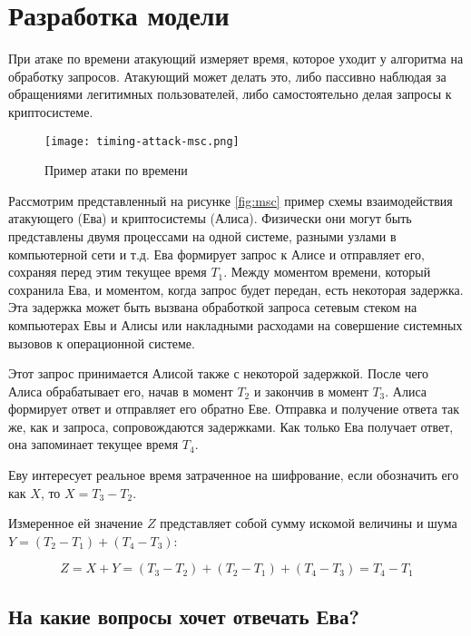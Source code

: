 \section{Разработка модели} \label{sec:timing}

При атаке по времени атакующий измеряет время, которое уходит у алгоритма на
обработку запросов. Атакующий может делать это, либо пассивно наблюдая за
обращениями легитимных пользователей, либо самостоятельно делая запросы к
криптосистеме.

\begin{figure}[h]
    \centering
    \texttt{[image: timing-attack-msc.png]}
    \caption{Пример атаки по времени}
\end{figure} \label{fig:msc}

Рассмотрим представленный на рисунке \ref{fig:msc} пример схемы взаимодействия
атакующего (Ева) и криптосистемы (Алиса). Физически они могут быть представлены
двумя процессами на одной системе, разными узлами в компьютерной сети и т.д.
Ева формирует запрос к Алисе и отправляет его, сохраняя перед этим текущее
время $T_1$. Между моментом времени, который сохранила Ева, и моментом, когда
запрос будет передан, есть некоторая задержка. Эта задержка может быть вызвана
обработкой запроса сетевым стеком на компьютерах Евы и Алисы или накладными
расходами на совершение системных вызовов к операционной системе.

Этот запрос принимается Алисой также с некоторой задержкой. После чего Алиса
обрабатывает его, начав в момент $T_2$ и закончив в момент $T_3$. Алиса
формирует ответ и отправляет его обратно Еве. Отправка и получение ответа так
же, как и запроса, сопровождаются задержками. Как только Ева получает ответ, она
запоминает текущее время $T_4$.

Еву интересует реальное время затраченное на шифрование, если обозначить его как
$X$, то $X = T_3 - T_2$.

Измеренное ей значение $Z$ представляет собой сумму искомой величины и шума
$Y = (T_2 - T_1) + (T_4 - T_3)$:

\begin{equation}
Z = X + Y = (T_3 - T_2) + (T_2 - T_1) + (T_4 - T_3) = T_4 - T_1
\end{equation} \label{eq:noise}

\subsection{На какие вопросы хочет отвечать Ева?}

